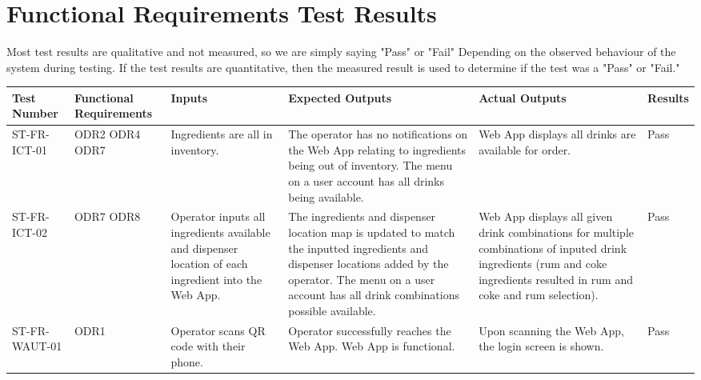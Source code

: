 \documentclass[12pt, titlepage]{article}
\begin{document}
\section{Functional Requirements Test Results}
Most test results are qualitative and not measured, so we are simply saying "Pass" or "Fail" Depending on the observed behaviour of the system during testing. If the test results are quantitative, then the measured result is used to determine if the test was a "Pass" or "Fail."
    \begin{rotate}{}
    \begin{landscape}
        \begin{table}
           \begin{tabular}{|p{2.75cm}|p{2.5cm}|p{4cm}|p{4.75cm}|p{4.25cm}|p{1.5cm}|}
            \hline
            Test Number & Functional \newline Requirements & Inputs & Expected Outputs & Actual Outputs & Results  \\ [0.5ex]
            \hline\hline
            ST-FR-ICT-01 & ODR2 \newline ODR4 \newline ODR7  & Ingredients are all in inventory. & The operator has no notifications on the Web App relating to ingredients being out of inventory. The menu on a user account has all drinks being available. & Web App displays all drinks are available for order. & Pass \\
            \hline
            ST-FR-ICT-02 & ODR7 \newline ODR8 & Operator inputs all ingredients available and dispenser location of each ingredient into the Web App. & The ingredients and dispenser location map is updated to match the inputted ingredients and dispenser locations added by the operator. The menu on a user account has all drink combinations possible available. & Web App displays all given drink combinations for multiple combinations of inputed drink ingredients (rum and coke ingredients resulted in rum and coke and rum selection). & Pass \\
            \hline
            ST-FR-WAUT-01 & ODR1 & Operator scans QR code with their phone. & Operator successfully reaches the Web App. Web App is functional. & Upon scanning the Web App, the login screen is shown. & Pass \\
            \hline
            

\end{tabular}
\end{table}
\end{landscape}
\end{rotate}
\end{document}
